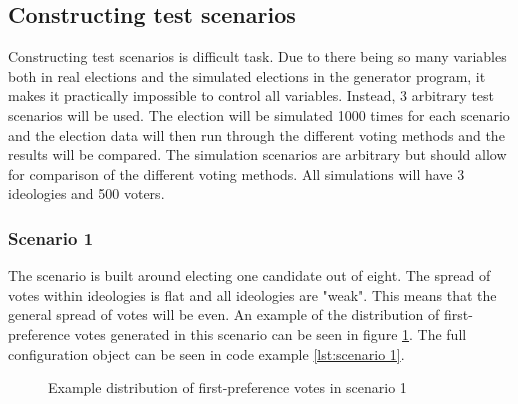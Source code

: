 \documentclass[12pt]{article}
\begin{document}
\subsection{Constructing test scenarios}
Constructing test scenarios is difficult task. Due to there being so many variables both in real elections and the simulated elections in the generator program, it makes it practically impossible to control all variables. Instead, 3 arbitrary test scenarios will be used. The election will be simulated 1000 times for each scenario and the election data will then run through the different voting methods and the results will be compared. The simulation scenarios are arbitrary but should allow for comparison of the different voting methods. All simulations will have 3 ideologies and 500 voters.
\subsubsection{Scenario 1}
The scenario is built around electing one candidate out of eight. The spread of votes within ideologies is flat and all ideologies are "weak". This means that the general spread of votes will be even. An example of the distribution of first-preference votes generated in this scenario can be seen in figure \ref{fig:example of scenario 1}. The full configuration object can be seen in code example \ref{lst:scenario 1}.
\begin{figure}[H]
	\centering
	\caption{Example distribution of first-preference votes in scenario 1}
	\label{fig:example of scenario 1}
\end{figure}
\end{document}
